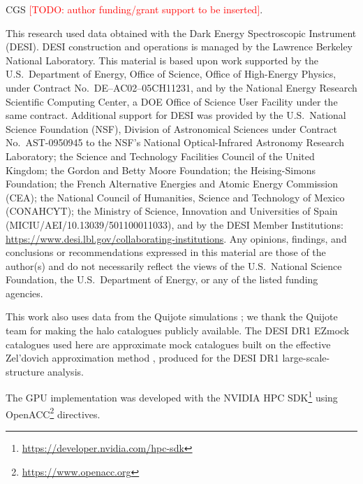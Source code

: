 \documentclass[twocolumn]{aastex701}
\newcommand{\todo}[1]{\textcolor{red}{[TODO: #1]}}
\begin{document}
\begin{acknowledgments}
CGS \todo{author funding/grant support to be inserted}.

This research used data obtained with the Dark Energy Spectroscopic
Instrument (DESI).  DESI construction and operations is managed by the
Lawrence Berkeley National Laboratory.  This material is based upon work
supported by the U.S.\ Department of Energy, Office of Science, Office of
High-Energy Physics, under Contract No.\ DE--AC02--05CH11231, and by the
National Energy Research Scientific Computing Center, a DOE Office of
Science User Facility under the same contract.  Additional support for
DESI was provided by the U.S.\ National Science Foundation (NSF), Division
of Astronomical Sciences under Contract No.\ AST-0950945 to the NSF's
National Optical-Infrared Astronomy Research Laboratory; the Science and
Technology Facilities Council of the United Kingdom; the Gordon and Betty
Moore Foundation; the Heising-Simons Foundation; the French Alternative
Energies and Atomic Energy Commission (CEA); the National Council of
Humanities, Science and Technology of Mexico (CONAHCYT); the Ministry of
Science, Innovation and Universities of Spain
(MICIU/AEI/10.13039/501100011033), and by the DESI Member Institutions:
\url{https://www.desi.lbl.gov/collaborating-institutions}.  Any opinions,
findings, and conclusions or recommendations expressed in this material
are those of the author(s) and do not necessarily reflect the views of the
U.S.\ National Science Foundation, the U.S.\ Department of Energy, or any
of the listed funding agencies.

This work also uses data from the Quijote simulations
\citep{villaescusa20}; we thank the Quijote team for making the halo
catalogues publicly available.  The DESI DR1 EZmock catalogues used here
are approximate mock catalogues built on the effective Zel'dovich
approximation method \citep{chuang15}, produced for the DESI DR1
large-scale-structure analysis.

The GPU implementation was developed with the NVIDIA HPC
SDK\footnote{\url{https://developer.nvidia.com/hpc-sdk}} using
OpenACC\footnote{\url{https://www.openacc.org}} directives.
\end{acknowledgments}

\facility{} %

\end{document}
